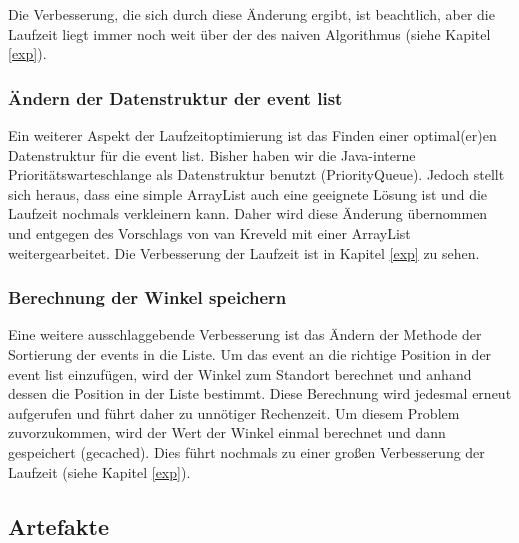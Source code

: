 Die Verbesserung, die sich durch diese Änderung ergibt, ist beachtlich, aber die Laufzeit liegt immer noch weit über der des naiven Algorithmus 
(siehe Kapitel \ref{exp}).

\subsubsection{Ändern der Datenstruktur der event list}
\label{list}
Ein weiterer Aspekt der Laufzeitoptimierung ist das Finden einer optimal(er)en Datenstruktur für die event list. Bisher haben wir die Java-interne 
Prioritätswarteschlange als Datenstruktur benutzt (PriorityQueue). Jedoch stellt sich heraus, dass eine simple ArrayList auch eine geeignete Lösung
ist und die Laufzeit nochmals verkleinern kann. Daher wird diese Änderung übernommen und entgegen des Vorschlags von van Kreveld mit einer ArrayList
weitergearbeitet. Die Verbesserung der Laufzeit ist in Kapitel \ref{exp} zu sehen.

\subsubsection{Berechnung der Winkel speichern}
\label{cached}
Eine weitere ausschlaggebende Verbesserung ist das Ändern der Methode der Sortierung der events in die Liste. Um das event an die richtige Position 
in der event list einzufügen, wird der Winkel zum Standort berechnet und anhand dessen die Position in der Liste bestimmt. Diese Berechnung wird 
jedesmal erneut aufgerufen und führt daher zu unnötiger Rechenzeit. Um diesem Problem zuvorzukommen, wird der Wert der Winkel einmal berechnet und 
dann gespeichert (\glqq gecached\grqq). Dies führt nochmals zu einer großen Verbesserung der Laufzeit (siehe Kapitel \ref{exp}).

\subsection{Artefakte}

